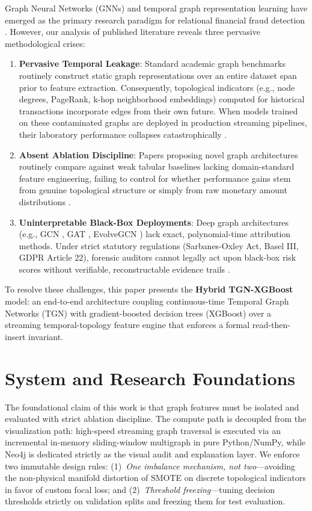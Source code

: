 \documentclass[journal]{IEEEtran}
\begin{document}
Graph Neural Networks (GNNs) and temporal graph representation learning have emerged as the primary research paradigm for relational financial fraud detection \cite{yuan2025survey,rossi2020temporal}. However, our analysis of published literature reveals three pervasive methodological crises:
\begin{enumerate}
    \item \textbf{Pervasive Temporal Leakage}: Standard academic graph benchmarks routinely construct static graph representations over an entire dataset span prior to feature extraction. Consequently, topological indicators (e.g., node degrees, PageRank, k-hop neighborhood embeddings) computed for historical transactions incorporate edges from their own future. When models trained on these contaminated graphs are deployed in production streaming pipelines, their laboratory performance collapses catastrophically \cite{jesus2022turning}.
    \item \textbf{Absent Ablation Discipline}: Papers proposing novel graph architectures routinely compare against weak tabular baselines lacking domain-standard feature engineering, failing to control for whether performance gains stem from genuine topological structure or simply from raw monetary amount distributions \cite{chen2016xgboost,lin2017focal}.
    \item \textbf{Uninterpretable Black-Box Deployments}: Deep graph architectures (e.g., GCN \cite{kipf2017gcn}, GAT \cite{velickovic2018gat}, EvolveGCN \cite{pareja2020evolvegcn}) lack exact, polynomial-time attribution methods. Under strict statutory regulations (Sarbanes-Oxley Act, Basel III, GDPR Article 22), forensic auditors cannot legally act upon black-box risk scores without verifiable, reconstructable evidence trails \cite{faccia2026xaiauditing,uddin2026shapley,lundberg2020treeshap}.
\end{enumerate}

To resolve these challenges, this paper presents the \textbf{Hybrid TGN-XGBoost} model: an end-to-end architecture coupling continuous-time Temporal Graph Networks (TGN) with gradient-boosted decision trees (XGBoost) over a streaming temporal-topology feature engine that enforces a formal read-then-insert invariant.

\section{System and Research Foundations}\label{sec:foundations}
The foundational claim of this work is that graph features must be isolated and evaluated with strict ablation discipline. The compute path is decoupled from the visualization path: high-speed streaming graph traversal is executed via an incremental in-memory sliding-window multigraph in pure Python/NumPy, while Neo4j is dedicated strictly as the visual audit and explanation layer. We enforce two immutable design rules: (1)~\emph{One imbalance mechanism, not two}---avoiding the non-physical manifold distortion of SMOTE on discrete topological indicators in favor of custom focal loss; and (2)~\emph{Threshold freezing}---tuning decision thresholds strictly on validation splits and freezing them for test evaluation.
\end{document}
